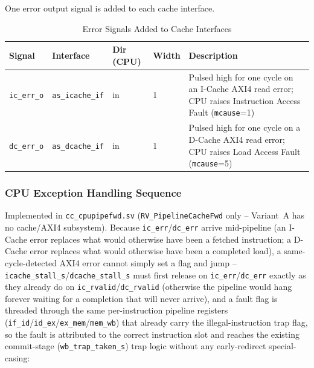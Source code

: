 One error output signal is added to each cache interface.

\begin{table}[H]
\caption{Error Signals Added to Cache Interfaces}
\label{tab:asErrSig}
\centering
\begin{tabularx}{\textwidth}{|l |l |l |l |X|}
  \hline
  Signal & Interface & Dir (CPU) & Width & Description \\
  \hline
  \hline
  \texttt{ic\_err\_o} & \texttt{as\_icache\_if} & in & 1 &
    Pulsed high for one cycle on an I-Cache AXI4 read error;
    CPU raises Instruction Access Fault (\texttt{mcause}=1) \\
  \hline
  \texttt{dc\_err\_o} & \texttt{as\_dcache\_if} & in & 1 &
    Pulsed high for one cycle on a D-Cache AXI4 read error;
    CPU raises Load Access Fault (\texttt{mcause}=5) \\
  \hline
\end{tabularx}
\end{table}

\subsubsection{CPU Exception Handling Sequence}
\label{ss:axi4ErrCpuSeq}

Implemented in \texttt{cc\_cpupipefwd.sv} (\texttt{RV\_PipelineCacheFwd}
only -- Variant~A has no cache/AXI4 subsystem). Because
\texttt{ic\_err}/\texttt{dc\_err} arrive mid-pipeline (an I-Cache error
replaces what would otherwise have been a fetched instruction; a D-Cache
error replaces what would otherwise have been a completed load), a
same-cycle-detected AXI4 error cannot simply set a flag and jump --
\texttt{icache\_stall\_s}/\texttt{dcache\_stall\_s} must first release on
\texttt{ic\_err}/\texttt{dc\_err} exactly as they already do on
\texttt{ic\_rvalid}/\texttt{dc\_rvalid} (otherwise the pipeline would hang
forever waiting for a completion that will never arrive), and a fault flag
is threaded through the same per-instruction pipeline registers
(\texttt{if\_id}/\texttt{id\_ex}/\texttt{ex\_mem}/\texttt{mem\_wb}) that
already carry the illegal-instruction trap flag, so the fault is attributed
to the correct instruction slot and reaches the existing commit-stage
(\texttt{wb\_trap\_taken\_s}) trap logic without any early-redirect
special-casing:

